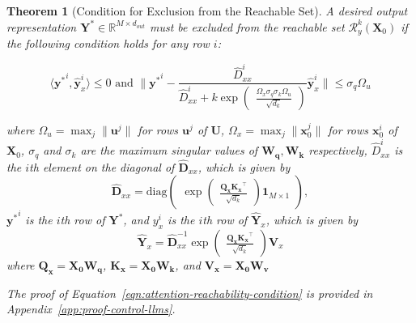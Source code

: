 \documentclass{article} %
\newtheorem{theorem}{Theorem}
\begin{document}
\begin{theorem}[Condition for Exclusion from the Reachable Set]
    \label{thm:attention-control}
    A desired output representation $\mathbf Y^* \in \mathbb R^{M\times d_{out}}$ must be excluded from the reachable set $\mathcal R_y^k(\mathbf X_0)$ if the following condition holds for any row $i$: 
    
    \begin{equation}
        \label{eqn:attention-reachability-condition}
        \langle {\mathbf y^*}^i, \hat {\mathbf y}_x^i  \rangle \leq 0
        \text{ and }
        \| {\mathbf y^*}^i - \frac{
            \hat D_{xx}^i
        }{
            \hat D_{xx}^i + k \exp \begin{pmatrix}
            \frac{\Omega_x \sigma_q \sigma_k \Omega_u}{\sqrt{d_k}}
        \end{pmatrix}
        }
        \hat{\mathbf y}_x^i \| 
        \leq 
        \sigma_q \Omega_u
    \end{equation}
    
    where $\Omega_u = \max_j \|\mathbf u^j\|$ for rows $\mathbf u^j$ of $\mathbf U$, 
    $\Omega_x=\max_j \|\mathbf x_0^j\|$ for rows $\mathbf x_0^i$ of $\mathbf X_0$, 
    $\sigma_q$ and $\sigma_k$ are the maximum singular values of $\mathbf{W_q, W_k}$ respectively, 
    $\hat D^i_{xx}$ is the $i$th element on the diagonal of $\mathbf{\hat D}_{xx}$, which is given by 
    \begin{equation}
        \label{eqn:dxx}
        \mathbf{\hat D}_{xx} = \text{diag} \begin{pmatrix}
            \exp \begin{pmatrix}
                \frac{\mathbf{Q_x K_x}^\top}{\sqrt{d_k}}
            \end{pmatrix} 
            \mathbf 1_{M\times 1}
        \end{pmatrix},
    \end{equation}
    ${\mathbf y^*}^i$ is the $i$th row of $\mathbf Y^*$,
    and $y_x^i$ is the $i$th row of $\hat {\mathbf Y}_x$, which is given by 
    \begin{equation}
        \label{eqn:hat-Y_x-def}
        \hat{\mathbf Y}_x = \mathbf{\hat D}_{xx}^{-1} \exp \begin{pmatrix}
            \frac{\mathbf{Q_x K_x}^\top}{\sqrt{d_k}}
        \end{pmatrix}
        \mathbf V_x
    \end{equation}
    where $\mathbf{Q_x = X_0 W_q}$, $\mathbf{K_x = X_0 W_k}$, and $\mathbf{V_x = X_0 W_v}$ 


    The proof of Equation~\ref{eqn:attention-reachability-condition} is provided in Appendix~\ref{app:proof-control-llms}. 
\end{theorem}
\end{document}
